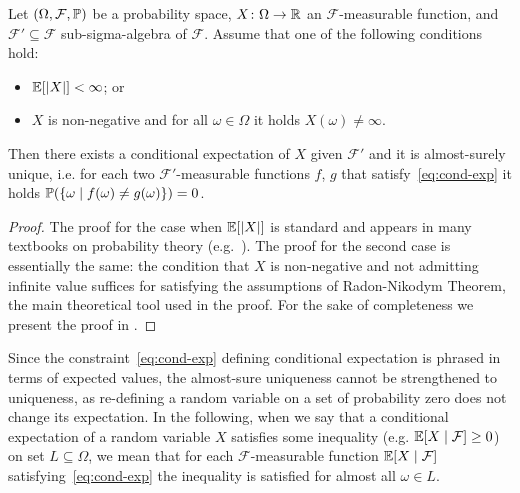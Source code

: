 \begin{proposition}
\label{prop:conditional-exp-existence}
Let $(\Omega,\mathcal{F},\mathbb{P})$ be a probability space, 
$X\colon\Omega\rightarrow 
\mathbb{R}$ an $\mathcal{F}$-measurable function, and $\mathcal{F}'\subseteq 
\mathcal{F}$ sub-sigma-algebra of $\mathcal{F}$. Assume that one of the following conditions hold:
\begin{itemize}
\item $\mathbb{E}[|X|]<\infty$; or
\item $X$ is non-negative and for all $\omega\in\Omega$ it holds $X(\omega)\neq \infty$.
\end{itemize}
Then there exists a conditional expectation of $X$ given $\mathcal{F}'$ and it is almost-surely unique, i.e. for each two $\mathcal{F}'$-measurable functions $f$, $g$ that satisfy~\eqref{eq:cond-exp} it holds $\mathbb{P}(\{\omega\mid f(\omega)\neq g(\omega)\})=0$.
\end{proposition}
\begin{proof}
The proof for the case when $\mathbb{E}[|X|]$ is standard and appears in many textbooks on probability theory (e.g.~\cite{Billingsley:book,Ash:book,Rosenthal:book}). The proof for the second case is essentially the same: the condition that $X$ is non-negative and not admitting infinite value suffices for satisfying the assumptions of Radon-Nikodym Theorem, the main theoretical tool used in the proof. For the sake of completeness we present the proof in \AppendixMaterial.
\end{proof}

Since the constraint~\eqref{eq:cond-exp} defining conditional expectation is phrased in terms of expected values, the almost-sure uniqueness cannot be strengthened to uniqueness, as re-defining a random variable on a set of probability zero does not change its expectation. In the following, when we say that a conditional expectation of a random variable $X$ satisfies some inequality (e.g. $\mathbb{E}[X\mid\mathcal{F}]\geq 0$) on set $L\subseteq \Omega$, we mean that for each $\mathcal{F}$-measurable function $\mathbb{E}[X\mid\mathcal{F}]$ satisfying~\eqref{eq:cond-exp} the inequality is satisfied for almost all $\omega \in L$.

